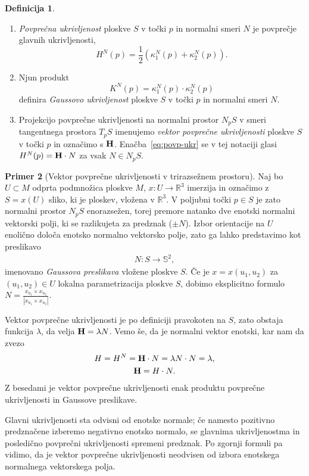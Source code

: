 \documentclass[12pt,a4paper,twoside]{article}
\theoremstyle{definition} %
\newtheorem{definicija}{Definicija}[section]
\newtheorem{primer}[definicija]{Primer}
\theoremstyle{plain} %
\numberwithin{equation}{section}  %
\begin{document}
\begin{definicija}
\begin{enumerate}
\item
\emph{Povprečna ukrivljenost} ploskve $S$ v točki $p$ in normalni smeri $N$ je povprečje glavnih ukrivljenosti,
\begin{equation} \label{eq:povp-ukr}
H^{N}(p) = \frac{1}{2} \left(\kappa _{1}^{N}(p) + \kappa _{2}^{N}(p) \right).
\end{equation}
\item
Njun produkt 
\begin{equation} \label{eq:Gauss-ukr}
K^{N}(p) = \kappa _{1}^{N}(p) \cdot \kappa _{2}^{N}(p)
\end{equation}
definira \emph{Gaussovo ukrivljenost} ploskve $S$ v točki $p$ in normalni smeri $N$.
\item
Projekcijo povprečne ukrivljenosti na normalni prostor $N_{p}S$ v smeri tangentnega prostora $T_{p}S$ imenujemo \emph{vektor povprečne ukrivljenosti} ploskve $S$ v točki $p$ in označimo s $\textbf{\textup{H}}$. Enačba~\eqref{eq:povp-ukr} se v tej notaciji glasi $H^{N}(p) = \textbf{\textup{H}} \cdot N$ za vsak $N \in N_{p}S$.
\end{enumerate}
\end{definicija}

\begin{primer}[Vektor povprečne ukrivljenosti v trirazsežnem prostoru]
Naj bo $U \subset M$ odprta podmnožica ploskve $M$, $x \colon U \to \mathbb{R}^{3}$ imerzija in označimo z $S = x(U)$ sliko, ki je ploskev, vložena v $\mathbb{R}^3$. V poljubni točki $p \in S$ je zato normalni prostor $N_{p}S$ enorazsežen, torej premore natanko dve enotski normalni vektorski polji, ki se razlikujeta za predznak ($\pm N$). Izbor orientacije na $U$ enolično določa enotsko normalno vektorsko polje, zato ga lahko predstavimo kot preslikavo
\begin{gather*}
N \colon S \to \mathbb{S}^{2},
\end{gather*}
imenovano \emph{Gaussova preslikava} vložene ploskve $S$. Če je $x = x(u_{1},u_{2})$ za $(u_{1},u_{2}) \in U$ lokalna parametrizacija ploskve $S$, dobimo eksplicitno formulo $N = \frac{x_{u_{1}} \times x_{u_{2}}}{|x_{u_{1}} \times x_{u_{2}}|}$.

Vektor povprečne ukrivljenosti je po definiciji pravokoten na $S$, zato obstaja funkcija $\lambda$, da velja $\textbf{\textup{H}} = \lambda N$. Vemo še, da je normalni vektor enotski, kar nam da zvezo
\begin{gather}
H = H^{N} = \textbf{\textup{H}} \cdot N = \lambda N \cdot N = \lambda, \nonumber \\
\textbf{\textup{H}} = H \cdot N.
\end{gather}
Z besedami je vektor povprečne ukrivljenosti enak produktu povprečne ukrivljenosti in Gaussove preslikave.

Glavni ukrivljenosti sta odvisni od enotske normale; če namesto pozitivno predznačene izberemo negativno enotsko normalo, se glavnima ukrivljenostma in posledično povprečni ukrivljenosti spremeni predznak. Po zgornji formuli pa vidimo, da je vektor povprečne ukrivljenosti neodvisen od izbora enotskega normalnega vektorskega polja.
\end{primer}
\end{document}

